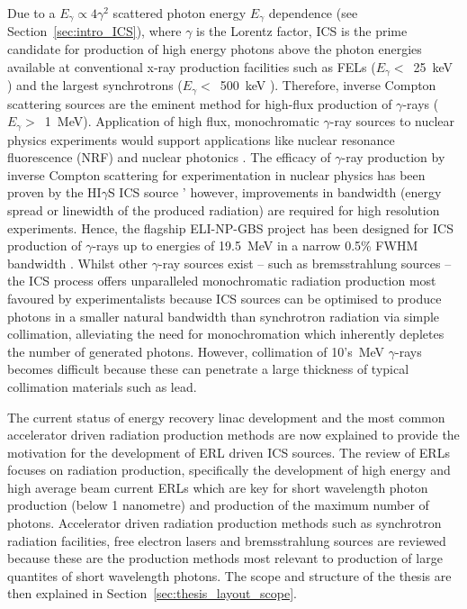 \documentclass[../main.tex]{subfiles}
\begin{document}
Due to a $E_{\gamma} \propto 4\gamma^{2}$ scattered photon energy $E_{\gamma}$ dependence (see Section~\ref{sec:intro_ICS}), where $\gamma$ is the Lorentz factor, ICS is the prime candidate for production of high energy photons above the photon energies available at conventional x-ray production facilities such as FELs ($E_{\gamma} <$~25~keV \cite{schneidmiller2011photon}) and the largest synchrotrons ($E_{\gamma} <$~500~keV \cite{spring8beamlines}). Therefore, inverse Compton scattering sources are the eminent method for high-flux production of $\gamma$-rays ($E_{\gamma}>$~1~MeV). Application of high flux, monochromatic $\gamma$-ray sources to nuclear physics experiments would support applications like nuclear resonance fluorescence (NRF) \cite{hayakawa2010nondestructive} and nuclear photonics \cite{budker2021expanding}. The efficacy of $\gamma$-ray production by inverse Compton scattering for experimentation in nuclear physics has been proven by the HI$\gamma$S ICS source \cite{weller2009research}' however, improvements in bandwidth (energy spread or linewidth of the produced radiation) are required for high resolution experiments. Hence, the flagship ELI-NP-GBS project \cite{adriani2014technical,elinp2019vega,tanaka2020current} has been designed for ICS production of $\gamma$-rays up to energies of 19.5~\si{\mega\electronvolt} in a narrow 0.5\% FWHM bandwidth \cite{elinp2019vega}. Whilst other $\gamma$-ray sources exist -- such as bremsstrahlung sources -- the ICS process offers unparalleled monochromatic radiation production most favoured by experimentalists because ICS sources can be optimised to produce photons in a smaller natural bandwidth than synchrotron radiation via simple collimation, alleviating the need for monochromation which inherently depletes the number of generated photons. However, collimation of 10's~\si{\mega\electronvolt} $\gamma$-rays becomes difficult because these can penetrate a large thickness of typical collimation materials such as lead.  

The current status of energy recovery linac development and the most common accelerator driven radiation production methods are now explained to provide the motivation for the development of ERL driven ICS sources. The review of ERLs focuses on radiation production, specifically the development of high energy and high average beam current ERLs which are key for short wavelength photon production (below 1 nanometre) and production of the maximum number of photons. Accelerator driven radiation production methods such as synchrotron radiation facilities, free electron lasers and bremsstrahlung sources are reviewed because these are the production methods most relevant to production of large quantites of short wavelength photons. The scope and structure of the thesis are then explained in Section~\ref{sec:thesis_layout_scope}.    
\end{document}
